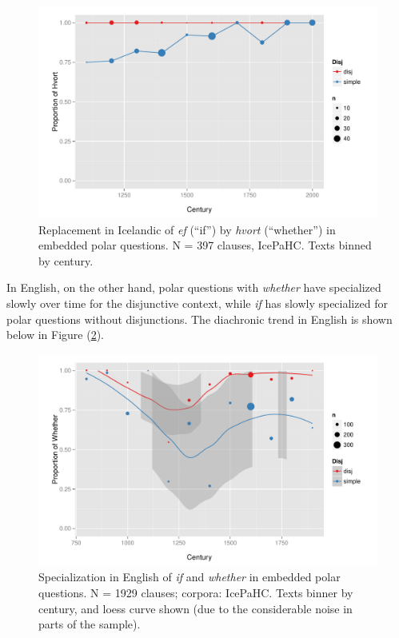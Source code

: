 \begin{figure}
    \begin{center}
    \includegraphics[scale=.7]{whetherifIce.pdf}
    \caption{Replacement in Icelandic of \textsl{ef} (``if'') by \textsl{hvort} (``whether'') in embedded polar questions. N = 397 clauses, IcePaHC. Texts binned by century.}
    \end{center}
    \label{hvort}
\end{figure}

In English, on the other hand, polar questions with \textsl{whether} have specialized slowly over time for the disjunctive context, while \textsl{if} has slowly specialized for polar questions without disjunctions.
The diachronic trend in English is shown below in Figure (\ref{whetherfig}).

\begin{figure}
    \begin{center}
    \includegraphics[scale=.7]{whetherifEngLoess.pdf}
    \caption{Specialization in English of \textsl{if} and \textsl{whether} in embedded polar questions. N = 1929 clauses; corpora: IcePaHC. Texts binner by century, and loess curve shown (due to the considerable noise in parts of the sample).}
    \end{center}
    \label{whetherfig}
\end{figure}


